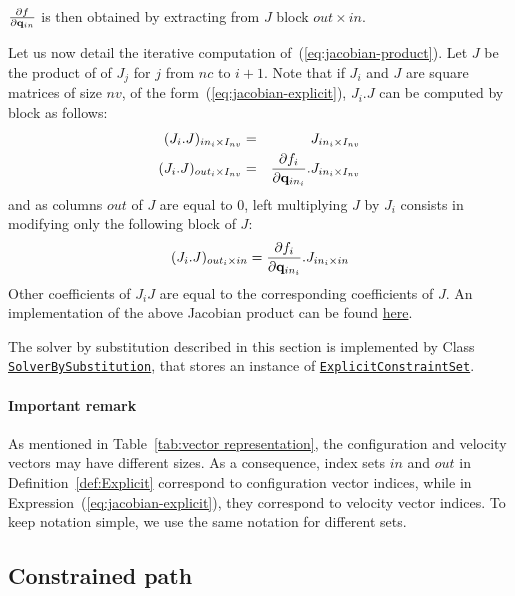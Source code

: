 $\frac{\partial f}{\partial\mathbf{q}_{in}}$ is then obtained by extracting from $J$ block $out\times in$.

Let us now detail the iterative computation of~(\ref{eq:jacobian-product}). Let $J$ be the product of of $J_j$ for $j$ from $nc$ to $i+1$.
Note that if $J_i$ and $J$ are square matrices of size $nv$, of the form~(\ref{eq:jacobian-explicit}), $J_i.J$ can be computed by block as follows:
\begin{eqnarray*}
  (J_{i}.J)_{in_{i}\times I_{nv}} &=& J_{in_{i}\times I_{nv}}\\
  (J_{i}.J)_{out_{i}\times I_{nv}} &=& \frac{\partial f_i}{\partial\mathbf{q}_{in_{i}}}.J_{in_{i}\times I_{nv}}\\
\end{eqnarray*}
and as columns $out$ of $J$ are equal to $0$, left multiplying $J$ by $J_i$ consists in modifying only the following block of $J$:
$$
  (J_{i}.J)_{out_{i}\times in} = \frac{\partial f_i}{\partial\mathbf{q}_{in_{i}}}.J_{in_{i}\times {in}}\\
$$
Other coefficients of $J_{i}J$ are equal to the corresponding coefficients of $J$.
An implementation of the above Jacobian product can be found \href{https://github.com/humanoid-path-planner/hpp-constraints/blob/e21490c8c713949bd3038dccb6fe02cf254a615f/src/explicit-constraint-set.cc\#L267}{here}.

The solver by substitution described in this section is implemented by Class \href{https://gepettoweb.laas.fr/hpp/hpp-constraints/doxygen-html/classhpp_1_1constraints_1_1solver_1_1BySubstitution.html}{\texttt{SolverBySubstitution}}, that stores an instance of \href{https://gepettoweb.laas.fr/hpp/hpp-constraints/doxygen-html/classhpp_1_1constraints_1_1ExplicitConstraintSet.html}{\texttt{ExplicitConstraintSet}}.

\paragraph{Important remark} As mentioned in Table~\ref{tab:vector representation}, the configuration and velocity vectors may have different sizes. As a consequence, index sets $in$ and $out$ in Definition~\ref{def:Explicit} correspond to configuration vector indices, while in Expression~(\ref{eq:jacobian-explicit}), they correspond to velocity vector indices. To keep notation simple, we use the same notation for different sets.

\subsection{Constrained path}

